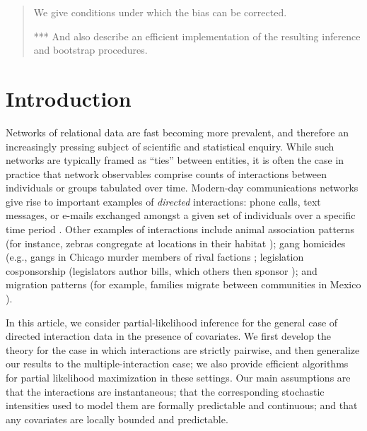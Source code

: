 \documentclass[aoas,preprint]{imsart}
\begin{document}
\begin{frontmatter}
\begin{abstract}
We give conditions under which the bias can be corrected.

*** And also describe an efficient implementation of the resulting inference and bootstrap procedures.
\end{abstract}

\begin{keyword}[class=AMS]
\end{keyword}

\begin{keyword}
\end{keyword}

\end{frontmatter}


\section{Introduction}

Networks of relational data are fast becoming more prevalent, and therefore an increasingly pressing subject of scientific and statistical enquiry.  While such networks are typically framed as ``ties'' between entities, it is often the case in practice that network observables comprise counts of interactions between individuals or groups tabulated over time.  Modern-day communications networks give rise to important examples of \emph{directed} interactions: phone calls, text messages, or e-mails exchanged amongst a given set of individuals over a specific time period \cite{eagle2006reality,tyler2005email}.  Other examples of interactions include animal association patterns (for instance, zebras congregate at locations in their habitat \cite{sundaresan2007network}); gang homicides (e.g., gangs in Chicago murder members of rival factions \cite{papachristos2009murder}; legislation cosponsorship (legislators author bills, which others then sponsor \cite{fowler2006connecting}); and migration patterns (for example, families migrate between communities in Mexico \cite{mckenzie2007network}).

In this article, we consider partial-likelihood inference for the general case of directed interaction data in the presence of covariates.  We first develop the theory for the case in which interactions are strictly pairwise, and then generalize our results to the multiple-interaction case; we also provide efficient algorithms for partial likelihood maximization in these settings.  Our main assumptions are that the interactions are instantaneous; that the corresponding stochastic intensities used to model them are formally predictable and continuous; and that any covariates are locally bounded and predictable.
\end{document}
